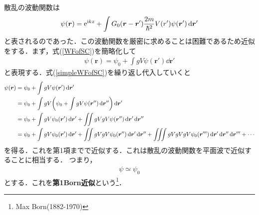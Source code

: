 \documentclass{report}
\begin{document}
 散乱の波動関数は
 \begin{align}
  \label{WFofSC}
  \psi(\bm{r}) = \mathrm{e}^{\mathrm{i} kz} + \int G_0 (\bm{r} - \bm{r}') \frac{2m}{\hbar^2} V(r') \psi(\bm{r}') \dd{\bm{r}'}
 \end{align}
 と表されるのであった．この波動関数を厳密に求めることは困難であるため近似をする．まず，式(\ref{WFofSC})を簡略化して
 \begin{align}
  \label{simpleWFofSC}
  \psi(\bm{r}) = \psi_0 + \int g V \psi(\bm{r}') \dd{\bm{r}'}
 \end{align}
 と表現する．式(\ref{simpleWFofSC})を繰り返し代入していくと
 \begin{align}
  \psi(\bm{r}) &= \psi_0 + \int g V \psi(\bm{r}') \dd{\bm{r}'}\\
  &= \psi_0 + \int gV \qty(\psi_0 + \int g V \psi(\bm{r}'') \dd{\bm{r}''}) \dd{\bm{r}'}\\
  &= \psi_0 + \int g V \psi_0(\bm{r}') \dd{\bm{r}'} + \iint gVgV \psi(\bm{r}'') \dd{\bm{r}'} \dd{\bm{r}''}\\
  &= \psi_0 + \int g V \psi_0(\bm{r}') \dd{\bm{r}'} + \iint gVgV \psi_0(\bm{r}'') \dd{\bm{r}'} \dd{\bm{r}''} + \iiint gVgVgV \psi_0(\bm{r}''') \dd{\bm{r}'} \dd{\bm{r}''} \dd{\bm{r}'''} + \cdots
 \end{align}
 を得る．これを第1項までで近似する．これは散乱の波動関数を平面波で近似することに相当する．
 つまり，
 \begin{align}
  \psi \simeq \psi_0
 \end{align}
 とする．これを\textbf{第1Born近似}という\footnote{Max Born(1882-1970)}．
\end{document}
